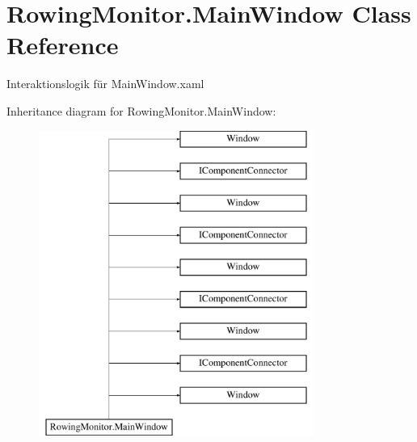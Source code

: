 \hypertarget{class_rowing_monitor_1_1_main_window}{}\section{Rowing\+Monitor.\+Main\+Window Class Reference}
\label{class_rowing_monitor_1_1_main_window}


Interaktionslogik für Main\+Window.\+xaml  


Inheritance diagram for Rowing\+Monitor.\+Main\+Window\+:\begin{figure}[H]
\begin{center}
\leavevmode
\includegraphics[height=10.000000cm]{class_rowing_monitor_1_1_main_window}
\end{center}
\end{figure}
